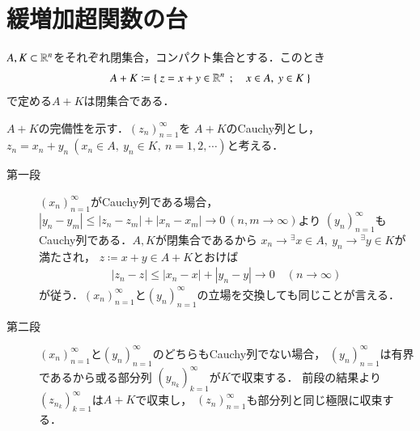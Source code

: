\section{緩増加超関数の台}
	\begin{screen}
		\begin{lem}[閉集合とコンパクト集合の和は閉]\label{lem:combination_closed_compact}
			$A,K \subset \mathbb{R}^n$をそれぞれ閉集合，コンパクト集合とする．このとき
			\begin{align}
				A + K \coloneqq \left\{\ z = x + y \in \mathbb{R}^n\ \, ; \quad x \in A,\ y \in K\ \right\}
			\end{align}
			で定める$A + K$は閉集合である．
		\end{lem}
	\end{screen}
	
	\begin{prf}
		$A+K$の完備性を示す．$(z_n)_{n=1}^{\infty}$を
		$A+K$のCauchy列とし，$z_n = x_n + y_n\ (x_n \in A,\ y_n \in K,\ n=1,2,\cdots)$と考える．
		\begin{description}
			\item[第一段]
				$(x_n)_{n=1}^{\infty}$がCauchy列である場合，
				$|y_n - y_m| \leq |z_n - z_m| + |x_n - x_m| \longrightarrow 0\ (n,m \longrightarrow \infty)$より
				$(y_n)_{n=1}^{\infty}$もCauchy列である．$A,K$が閉集合であるから
				$x_n \longrightarrow {}^\exists x \in A,\ y_n \longrightarrow {}^\exists y \in K$が満たされ，
				$z \coloneqq x + y \in A + K$とおけば
				\begin{align}
					|z_n - z| \leq |x_n - x| + |y_n - y| \longrightarrow 0
					\quad (n \longrightarrow \infty)
				\end{align}
				が従う．$(x_n)_{n=1}^{\infty}$と$(y_n)_{n=1}^{\infty}$の立場を交換しても同じことが言える．
			
			\item[第二段]
				$(x_n)_{n=1}^{\infty}$と$(y_n)_{n=1}^{\infty}$のどちらもCauchy列でない場合，
				$(y_n)_{n=1}^{\infty}$は有界であるから或る部分列
				$(y_{n_k})_{k=1}^{\infty}$が$K$で収束する．
				前段の結果より$(z_{n_k})_{k=1}^{\infty}$は$A + K$で収束し，
				$(z_n)_{n=1}^{\infty}$も部分列と同じ極限に収束する．
				\QED
		\end{description}
	\end{prf}
	
